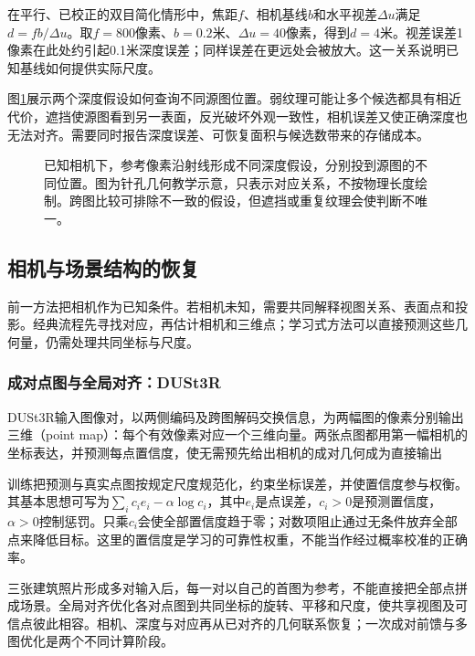 在平行、已校正的双目简化情形中，焦距$f$、相机基线$b$和水平视差$\Delta u$满足$d=fb/\Delta u$。取$f=800$像素、$b=0.2$米、$\Delta u=40$像素，得到$d=4$米。视差误差1像素在此处约引起0.1米深度误差；同样误差在更远处会被放大。这一关系说明已知基线如何提供实际尺度。

图\ref{fig:vision-depth-hypotheses}展示两个深度假设如何查询不同源图位置。弱纹理可能让多个候选都具有相近代价，遮挡使源图看到另一表面，反光破坏外观一致性，相机误差又使正确深度也无法对齐。需要同时报告深度误差、可恢复面积与候选数带来的存储成本。

\begin{figure}[htbp]
 \centering
 
 \caption{已知相机下，参考像素沿射线形成不同深度假设，分别投到源图的不同位置。图为针孔几何教学示意，只表示对应关系，不按物理长度绘制。跨图比较可排除不一致的假设，但遮挡或重复纹理会使判断不唯一。}
 \label{fig:vision-depth-hypotheses}
\end{figure}

\subsection{相机与场景结构的恢复}
\label{sec:vision-recognition-geometry}

前一方法把相机作为已知条件。若相机未知，需要共同解释视图关系、表面点和投影。经典流程先寻找对应，再估计相机和三维点；学习式方法可以直接预测这些几何量，仍需处理共同坐标与尺度。

\Needspace{65mm}
\subsubsection{成对点图与全局对齐：DUSt3R}
\label{sec:vision-recognition-dust3r}

DUSt3R输入图像对，以两侧编码及跨图解码交换信息，为两幅图的像素分别输出三维（point map）：每个有效像素对应一个三维向量。两张点图都用第一幅相机的坐标表达，并预测每点置信度，使无需预先给出相机的成对几何成为直接输出

训练把预测与真实点图按规定尺度规范化，约束坐标误差，并使置信度参与权衡。其基本思想可写为$\sum_i c_i e_i-\alpha\log c_i$，其中$e_i$是点误差，$c_i>0$是预测置信度，$\alpha>0$控制惩罚。只乘$c_i$会使全部置信度趋于零；对数项阻止通过无条件放弃全部点来降低目标。这里的置信度是学习的可靠性权重，不能当作经过概率校准的正确率。

三张建筑照片形成多对输入后，每一对以自己的首图为参考，不能直接把全部点拼成场景。全局对齐优化各对点图到共同坐标的旋转、平移和尺度，使共享视图及可信点彼此相容。相机、深度与对应再从已对齐的几何联系恢复；一次成对前馈与多图优化是两个不同计算阶段。

